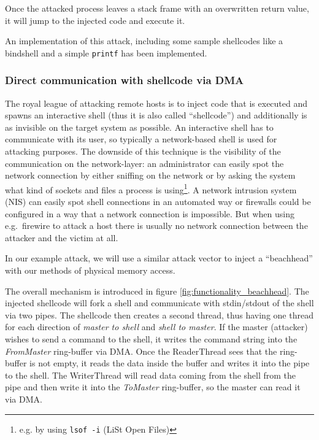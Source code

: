 Once the attacked process leaves a stack frame with an overwritten return value,
it will jump to the injected code and execute it.

An implementation of this attack, including some sample shellcodes like a
bindshell and a simple \texttt{printf} has been implemented. %



\subsubsection{Direct communication with shellcode via DMA}


\label{communication_DMA} The royal league of attacking remote hosts is to
inject code that is executed and spawns an interactive shell (thus it is also
called ``shellcode'') and additionally is as invisible on the target system as
possible.  An interactive shell has to communicate with its user, so typically a
network-based shell is used for attacking purposes. The downside of this
technique is the visibility of the communication on the network-layer: an
administrator can easily spot the network connection by either sniffing on the
network or by asking the system what kind of sockets and files a process is
using\footnote{e.g. by using \texttt{lsof -i} (LiSt Open Files)}. A network
intrusion system (NIS) can easily spot shell connections in an automated way or
firewalls could be configured in a way that a network connection is impossible.
But when using e.g.~firewire to attack a host there is usually no network
connection between the attacker and the victim at all.

In our example attack, we will use a similar attack vector to inject a
``beachhead'' with our methods of physical memory access.

The overall mechanism is introduced in figure \ref{fig:functionality_beachhead}.
The injected shellcode will fork a shell and communicate with stdin/stdout of
the shell via two pipes. The shellcode then creates a second thread, thus having
one thread for each direction of \emph{master to shell} and \emph{shell to
master}. If the master (attacker) wishes to send a command to the shell, it
writes the command string into the \emph{FromMaster} ring-buffer via DMA.  Once
the ReaderThread sees that the ring-buffer is not empty, it reads the data
inside the buffer and writes it into the pipe to the shell.  The WriterThread
will read data coming from the shell from the pipe and then write it into the
\emph{ToMaster} ring-buffer, so the master can read it via DMA.

